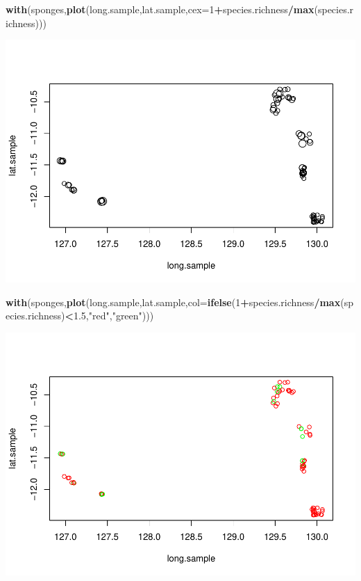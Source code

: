 \documentclass[
]{book}
\newenvironment{Shaded}{\begin{snugshade}}{\end{snugshade}}
\newcommand{\AttributeTok}[1]{\textcolor[rgb]{0.13,0.29,0.53}{#1}}
\newcommand{\DecValTok}[1]{\textcolor[rgb]{0.00,0.00,0.81}{#1}}
\newcommand{\FloatTok}[1]{\textcolor[rgb]{0.00,0.00,0.81}{#1}}
\newcommand{\FunctionTok}[1]{\textcolor[rgb]{0.13,0.29,0.53}{\textbf{#1}}}
\newcommand{\NormalTok}[1]{#1}
\newcommand{\SpecialCharTok}[1]{\textcolor[rgb]{0.81,0.36,0.00}{\textbf{#1}}}
\newcommand{\StringTok}[1]{\textcolor[rgb]{0.31,0.60,0.02}{#1}}
\begin{document}
\begin{Shaded}
\begin{Highlighting}[]
\FunctionTok{with}\NormalTok{(sponges,}\FunctionTok{plot}\NormalTok{(long.sample,lat.sample,}\AttributeTok{cex=}\DecValTok{1}\SpecialCharTok{+}\NormalTok{species.richness}\SpecialCharTok{/}\FunctionTok{max}\NormalTok{(species.richness))) }
\end{Highlighting}
\end{Shaded}

\includegraphics{ECOMODbook_files/figure-latex/unnamed-chunk-66-2.pdf}

\begin{Shaded}
\begin{Highlighting}[]
\FunctionTok{with}\NormalTok{(sponges,}\FunctionTok{plot}\NormalTok{(long.sample,lat.sample,}\AttributeTok{col=}\FunctionTok{ifelse}\NormalTok{(}\DecValTok{1}\SpecialCharTok{+}\NormalTok{species.richness}\SpecialCharTok{/}\FunctionTok{max}\NormalTok{(species.richness)}\SpecialCharTok{\textless{}}\FloatTok{1.5}\NormalTok{,}\StringTok{"red"}\NormalTok{,}\StringTok{"green"}\NormalTok{))) }
\end{Highlighting}
\end{Shaded}

\includegraphics{ECOMODbook_files/figure-latex/unnamed-chunk-66-3.pdf}
\end{document}
